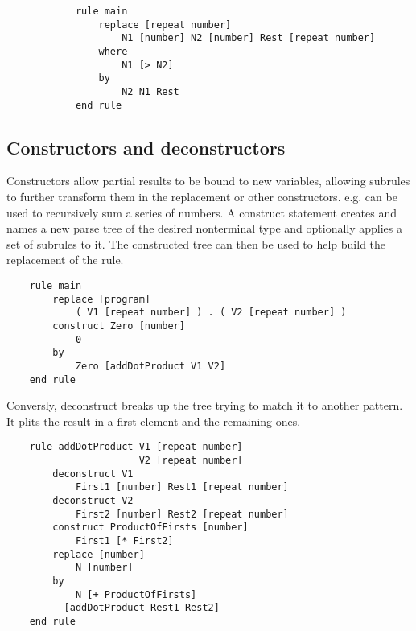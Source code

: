 		\begin{lstlisting}
			rule main
			    replace [repeat number]
			        N1 [number] N2 [number] Rest [repeat number]
			    where
			        N1 [> N2]
			    by
			        N2 N1 Rest
			end rule
		\end{lstlisting}
	
	\subsection{Constructors and deconstructors}
	Constructors allow partial results to be bound to new variables, allowing subrules to further transform them in the replacement or other constructors. e.g. can be used to recursively sum a series of numbers.
	A construct statement creates and names a new parse tree of the desired nonterminal type and optionally applies a set of subrules to it. The constructed tree can then be used to help build the replacement of the rule. 
	
	\begin{lstlisting}
	rule main
	    replace [program]
	        ( V1 [repeat number] ) . ( V2 [repeat number] )
	    construct Zero [number]
	        0
	    by
	        Zero [addDotProduct V1 V2]
	end rule
	\end{lstlisting}
	
	Conversly, deconstruct breaks up the tree trying to match it to another pattern. It plits the result in a first element and the remaining ones.
	\begin{lstlisting}
	rule addDotProduct V1 [repeat number] 
	                   V2 [repeat number]
	    deconstruct V1
	        First1 [number] Rest1 [repeat number]
	    deconstruct V2
	        First2 [number] Rest2 [repeat number]
	    construct ProductOfFirsts [number]
	        First1 [* First2]
	    replace [number]
	        N [number]
	    by
	        N [+ ProductOfFirsts] 
		  [addDotProduct Rest1 Rest2]
	end rule
	\end{lstlisting}
		
